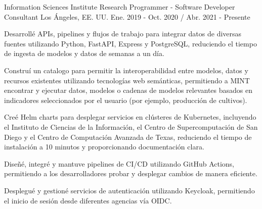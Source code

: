 \begin{cventries}

  \cventry
    {Information Sciences Institute}
    {Research Programmer - Software Developer Consultant}
    {Los Ángeles, EE. UU.}
    {Ene. 2019 - Oct. 2020 / Abr. 2021 - Presente}
    {
      \begin{cvitems}
        \item{Desarrollé APIs, pipelines y flujos de trabajo para integrar datos de diversas fuentes utilizando Python, FastAPI, Express y PostgreSQL, reduciendo el tiempo de ingesta de modelos y datos de semanas a un día.}
        \item{Construí un catalogo para permitir la interoperabilidad entre modelos, datos y recursos existentes utilizando tecnologías web semánticas, permitiendo a MINT encontrar y ejecutar datos, modelos o cadenas de modelos relevantes basados en indicadores seleccionados por el usuario (por ejemplo, producción de cultivos).}
        \item{Creé Helm charts para desplegar servicios en clústeres de Kubernetes, incluyendo el Instituto de Ciencias de la Información, el Centro de Supercomputación de San Diego y el Centro de Computación Avanzada de Texas, reduciendo el tiempo de instalación a 10 minutos y proporcionando documentación clara.}
        \item{Diseñé, integré y mantuve pipelines de CI/CD utilizando GitHub Actions, permitiendo a los desarrolladores probar y desplegar cambios de manera eficiente.}
        \item{Desplegué y gestioné servicios de autenticación utilizando Keycloak, permitiendo el inicio de sesión desde diferentes agencias vía OIDC.}
      \end{cvitems}
    }


\end{cventries}
